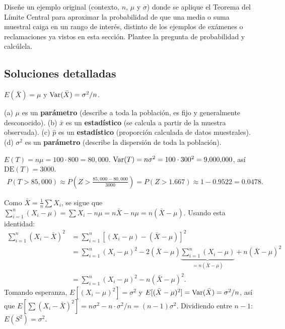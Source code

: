 \begin{problema}
	\label{prob:2e2f544}
	Diseñe un ejemplo original (contexto, $n$, $\mu$ y $\sigma$) donde se aplique el Teorema del Límite Central para aproximar la probabilidad de que una media o suma muestral caiga en un rango de interés, distinto de los ejemplos de exámenes o reclamaciones ya vistos en esta sección. Plantee la pregunta de probabilidad y calcúlela.
\end{problema}

\subsection*{Soluciones detalladas}

\begin{solproblema}[prob:22013b6]
	$E(\bar{X}) = \mu$ y $\operatorname{Var}(\bar{X}) = \sigma^2/n$.
\end{solproblema}

\begin{solproblema}[prob:f4e7b8b]
	(a) $\mu$ es un \textbf{parámetro} (describe a toda la población, es fijo y generalmente desconocido). (b) $\bar{x}$ es un \textbf{estadístico} (se calcula a partir de la muestra observada). (c) $\hat{p}$ es un \textbf{estadístico} (proporción calculada de datos muestrales). (d) $\sigma^2$ es un \textbf{parámetro} (describe la dispersión de toda la población).
\end{solproblema}

\begin{solproblema}[prob:6815de7]
	$E(T) = n\mu = 100\cdot800 = 80{,}000$. $\operatorname{Var}(T) = n\sigma^2 = 100\cdot300^2 = 9{,}000{,}000$, así $\text{DE}(T)=3000$.
	\begin{align*}
		P(T > 85{,}000) \approx P\left(Z > \frac{85{,}000-80{,}000}{3000}\right) = P(Z > 1.667) \approx 1-0.9522 = 0.0478.
	\end{align*}
\end{solproblema}

\begin{solproblema}[prob:716e9bb]
	Como $\bar X = \frac{1}{n}\sum X_i$, se sigue que $\sum_{i=1}^n(X_i-\mu) = \sum X_i - n\mu = n\bar X - n\mu = n(\bar X-\mu)$. Usando esta identidad:
	\begin{align*}
		\sum_{i=1}^n(X_i-\bar X)^2 &= \sum_{i=1}^n\left[(X_i-\mu)-(\bar X-\mu)\right]^2 \\
		&= \sum_{i=1}^n(X_i-\mu)^2 - 2(\bar X-\mu)\underbrace{\sum_{i=1}^n(X_i-\mu)}_{=n(\bar X-\mu)} + n(\bar X-\mu)^2 \\
		&= \sum_{i=1}^n(X_i-\mu)^2 - n(\bar X-\mu)^2.
	\end{align*}
	Tomando esperanza, $E[(X_i-\mu)^2]=\sigma^2$ y $E[(\bar X-\mu)^2]=\operatorname{Var}(\bar X)=\sigma^2/n$, así que $E\left[\sum(X_i-\bar X)^2\right] = n\sigma^2 - n\cdot\sigma^2/n = (n-1)\sigma^2$. Dividiendo entre $n-1$: $E(S^2)=\sigma^2$.
\end{solproblema}

